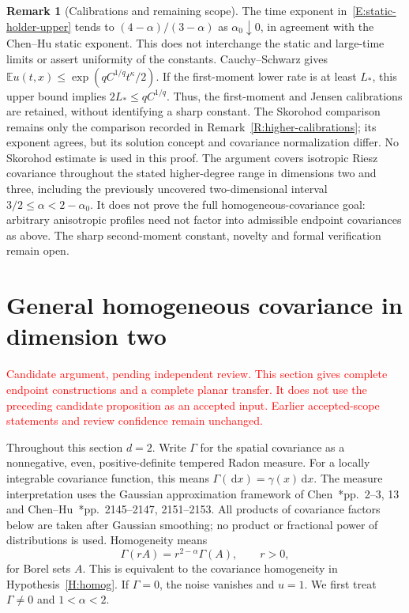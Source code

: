 \documentclass[12pt]{article}
\numberwithin{equation}{section}
\theoremstyle{definition}
\newtheorem{remark}[theorem]{Remark}
\newcommand{\E}{\mathbb{E}}
\newcommand{\ud}{\,\mathrm{d}}
\newcommand{\myCmts}[1]{\begin{framed}\noindent\textcolor{red}{#1}\end{framed}}
\begin{document}
\begin{remark}[Calibrations and remaining scope]\label{R:static-holder-scope}
  The time exponent in~\eqref{E:static-holder-upper} tends to
  $(4-\alpha)/(3-\alpha)$ as $\alpha_0\downarrow0$, in agreement
  with the Chen--Hu static exponent. This does not interchange the
  static and large-time limits or assert uniformity of the constants.
  Cauchy--Schwarz gives $\E u(t,x)\le
  \exp(qC^{1/q}t^\kappa/2)$. If the first-moment lower rate is at
  least $L_*$, this upper bound implies $2L_*\le qC^{1/q}$.
  Thus, the first-moment and Jensen calibrations are retained, without
  identifying a sharp constant. The Skorohod comparison remains only
  the comparison recorded in Remark~\ref{R:higher-calibrations}; its
  exponent agrees, but its solution concept and covariance normalization
  differ. No Skorohod estimate is used in this proof. The argument covers
  isotropic Riesz covariance throughout the stated higher-degree range
  in dimensions two and three, including the previously uncovered
  two-dimensional interval $3/2\le\alpha<2-\alpha_0$.
  It does not prove the full homogeneous-covariance goal: arbitrary
  anisotropic profiles need not factor into admissible endpoint
  covariances as above. The sharp second-moment constant, novelty and
  formal verification remain open.
\end{remark}

\section{General homogeneous covariance in dimension two}
\label{S:planar-holder}

\myCmts{Candidate argument, pending independent review. This section gives
complete endpoint constructions and a complete planar transfer. It does not
use the preceding candidate proposition as an accepted input. Earlier
accepted-scope statements and review confidence remain unchanged.}

Throughout this section $d=2$. Write $\Gamma$ for the spatial covariance
as a nonnegative, even, positive-definite tempered Radon measure. For a
locally integrable covariance function, this means
$\Gamma(\ud x)=\gamma(x)\ud x$. The measure interpretation uses the Gaussian
approximation framework of
Chen~\cite{chen:author2026:time-dependency}*{pp.~2--3, 13} and
Chen--Hu~\cite{chen.hu:25:hyperbolic}*{pp.~2145--2147, 2151--2153}.
All products of covariance factors below are taken after Gaussian smoothing;
no product or fractional power of distributions is used. Homogeneity means
\begin{equation}\label{E:planar-measure-scaling}
  \Gamma(rA)=r^{2-\alpha}\Gamma(A),\qquad r>0,
\end{equation}
for Borel sets $A$. This is equivalent to the covariance homogeneity in
Hypothesis~\ref{H:homog}. If $\Gamma=0$, the noise vanishes and $u=1$.
We first treat $\Gamma\ne0$ and $1<\alpha<2$.
\end{document}
